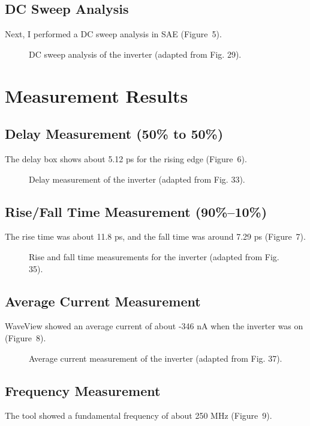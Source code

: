\documentclass[11pt]{article}
\begin{document}
\subsection*{DC Sweep Analysis}
Next, I performed a DC sweep analysis in SAE (Figure~5).

\begin{figure}[h!]
    \centering
    \fbox{\rule{0.6\textwidth}{2in}}
    \caption{DC sweep analysis of the inverter (adapted from Fig. 29).}
\end{figure}

\section*{Measurement Results}
\subsection*{Delay Measurement (50\% to 50\%)}
The delay box shows about 5.12 ps for the rising edge (Figure~6).

\begin{figure}[h!]
    \centering
    \fbox{\rule{0.6\textwidth}{2in}}
    \caption{Delay measurement of the inverter (adapted from Fig. 33).}
\end{figure}

\subsection*{Rise/Fall Time Measurement (90\%--10\%)}
The rise time was about 11.8 ps, and the fall time was around 7.29 ps (Figure~7).

\begin{figure}[h!]
    \centering
    \fbox{\rule{0.6\textwidth}{2in}}
    \caption{Rise and fall time measurements for the inverter (adapted from Fig. 35).}
\end{figure}

\subsection*{Average Current Measurement}
WaveView showed an average current of about -346 nA when the inverter was on (Figure~8).

\begin{figure}[h!]
    \centering
    \fbox{\rule{0.6\textwidth}{2in}}
    \caption{Average current measurement of the inverter (adapted from Fig. 37).}
\end{figure}

\subsection*{Frequency Measurement}
The tool showed a fundamental frequency of about 250 MHz (Figure~9).
\end{document}
